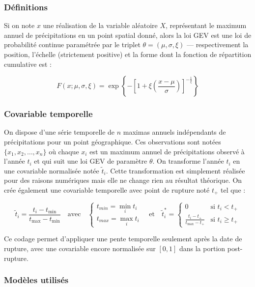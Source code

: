 \documentclass[
  article,
  nofooter,
  noheadings]{jss}
\begin{document}
\subsubsection{Définitions}\label{duxe9finitions}

Si on note \(x\) une réalisation de la variable aléatoire \(X\),
représentant le maximum annuel de précipitations en un point spatial
donné, alors la loi GEV est une loi de probabilité continue paramétrée
par le triplet \(\theta = (\mu, \sigma, \xi)\) --- respectivement la
position, l'échelle (strictement positive) et la forme dont la fonction
de répartition cumulative est :

\[
F(x;\mu ,\sigma ,\xi ) = \exp \left\{ -\left[ 1 + \xi \left( \frac{x - \mu}{\sigma} \right) \right]^{-\frac{1}{\xi}} \right\}
\]

\subsubsection{Covariable temporelle}\label{covariable-temporelle}

On dispose d'une série temporelle de \(n\) maximas annuels indépendants
de précipitations pour un point géographique. Ces observations sont
notées \(\{x_1, x_2, \dots, x_n\}\) où chaque \(x_i\) est un maximum
annuel de précipitations observé à l'année \(t_i\) et qui suit une loi
GEV de paramètre \(\theta\). On transforme l'année \(t_i\) en une
covariable normalisée notée \(\tilde{t}_i\). Cette transformation est
simplement réalisée pour des raisons numériques mais elle ne change rien
au résultat théorique. On crée également une covariable temporelle avec
point de rupture noté \(t_+\) tel que :

\[
\tilde{t}_i = \frac{t_i - t_{\min}}{t_{\max} - t_{\min}} \quad \text{avec} \quad \begin{cases}
t_{min} = \min_i t_i \\
t_{max} = \max_i t_i
\end{cases} \quad \text{et} \quad
\tilde{t}_{i}^\ast =
\begin{cases}
0 & \text{si } t_i < t_+ \\
\displaystyle \frac{t_i - t_+}{t_{\max} - t_+} & \text{si } t_i \ge t_+
\end{cases}
\]

Ce codage permet d'appliquer une pente temporelle seulement après la
date de rupture, avec une covariable encore normalisée sur \([0,1]\)
dans la portion post-rupture.

\subsubsection{Modèles utilisés}\label{moduxe8les-utilisuxe9s}
\end{document}

